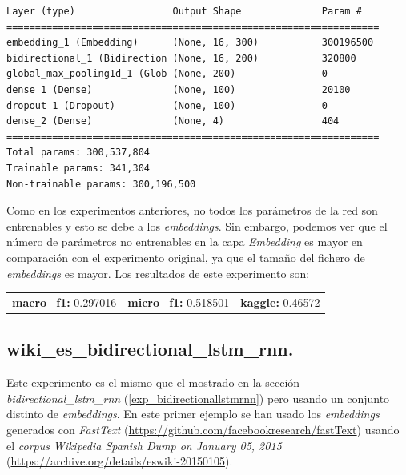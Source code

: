 \documentclass[11pt]{article}
\begin{document}
\begin{verbatim}
Layer (type)                 Output Shape              Param #   
=================================================================
embedding_1 (Embedding)      (None, 16, 300)           300196500 
bidirectional_1 (Bidirection (None, 16, 200)           320800    
global_max_pooling1d_1 (Glob (None, 200)               0         
dense_1 (Dense)              (None, 100)               20100     
dropout_1 (Dropout)          (None, 100)               0         
dense_2 (Dense)              (None, 4)                 404       
=================================================================
Total params: 300,537,804
Trainable params: 341,304
Non-trainable params: 300,196,500
\end{verbatim}

Como en los experimentos anteriores, no todos los parámetros de la red son entrenables y esto se debe a los \textit{embeddings}. Sin embargo, podemos ver que el número de parámetros no entrenables en la capa \textit{Embedding} es mayor en comparación con el experimento original, ya que el tamaño del fichero de \textit{embeddings} es mayor. Los resultados de este experimento son: 

\begin{table}[H]
\begin{tabular}{c|c|c}
\textbf{macro\_f1:} 0.297016 & \textbf{micro\_f1:} 0.518501 & \textbf{kaggle:} 0.46572
\end{tabular}
\end{table}

\subsection{wiki\_es\_bidirectional\_lstm\_rnn.} \label{exp_wikiesbidirectionallstmrnn}

Este experimento es el mismo que el mostrado en la sección \textit{bidirectional\_lstm\_rnn} (\ref{exp_bidirectionallstmrnn}) pero usando un conjunto distinto de \textit{embeddings}. En este primer ejemplo se han usado los \textit{embeddings} generados con \textit{FastText} (\href{https://github.com/facebookresearch/fastText}{https://github.com/facebookresearch/fastText}) usando el \textit{corpus} \textit{Wikipedia Spanish Dump on January 05, 2015} (\href{https://archive.org/details/eswiki-20150105}{https://archive.org/details/eswiki-20150105}).
\end{document}
